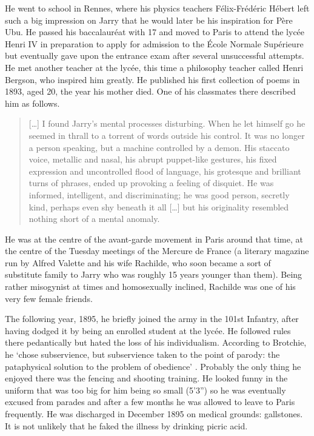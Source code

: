 He went to school in Rennes, where his physics teachers Félix-Frédéric Hébert left such a big impression on Jarry that he would later be his inspiration for Père Ubu. He passed his baccalauréat with 17 and moved to Paris to attend the lycée Henri IV in preparation to apply for admission to the École Normale Supérieure but eventually gave upon the entrance exam after several unsuccessful attempts. He met another teacher at the lycée, this time a philosophy teacher called Henri Bergson, who inspired him greatly. He published his first collection of poems in 1893, aged 20, the year his mother died. One of his classmates there described him as follows.

\begin{quotation}
  [\ldots] I found Jarry's mental processes disturbing. When he let himself go he seemed in thrall to a torrent of words outside his control. It was no longer a person speaking, but a machine controlled by a demon. His staccato voice, metallic and nasal, his abrupt puppet-like gestures, his fixed expression and uncontrolled flood of language, his grotesque and brilliant turns of phrases, ended up provoking a feeling of disquiet. He was informed, intelligent, and discriminating; he was good person, secretly kind, perhaps even shy beneath it all [\ldots] but his originality resembled nothing short of a mental anomaly. 
\end{quotation}

He was at the centre of the avant-garde movement in Paris around that time, at the centre of the Tuesday meetings of the Mercure de France (a literary magazine run by Alfred Valette and his wife Rachilde, who soon became a sort of substitute family to Jarry who was roughly 15 years younger than them). Being rather misogynist at times and homosexually inclined, Rachilde was one of his very few female friends.

The following year, 1895, he briefly joined the army in the 101st Infantry, after having dodged it by being an enrolled student at the lycée. He followed rules there pedantically but hated the loss of his individualism. According to Brotchie, he `chose subservience, but subservience taken to the point of parody: the pataphysical solution to the problem of obedience' \autocite{Brotchie2011}. Probably the only thing he enjoyed there was the fencing and shooting training. He looked funny in the uniform that was too big for him being so small (5'3'') so he was eventually excused from parades and after a few months he was allowed to leave to Paris frequently. He was discharged in December 1895 on medical grounds: gallstones. It is not unlikely that he faked the illness by drinking picric acid.

